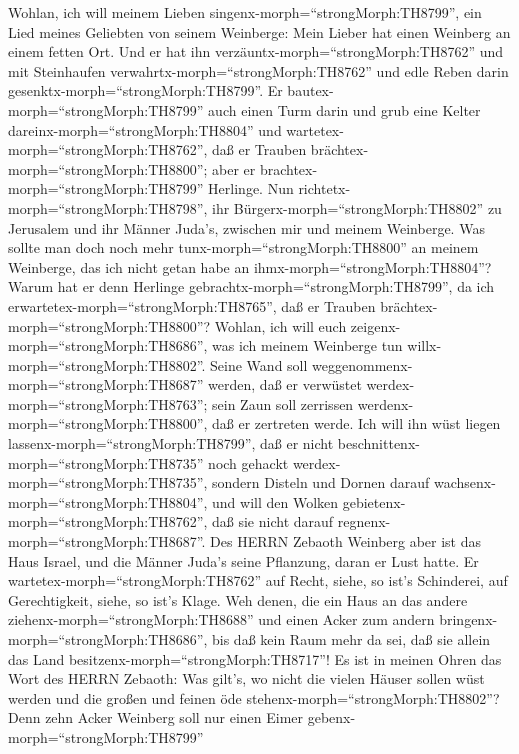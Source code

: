  Wohlan, ich will meinem Lieben
singenx-morph=``strongMorph:TH8799'', ein Lied meines Geliebten von
seinem Weinberge: Mein Lieber hat einen Weinberg an einem fetten Ort.
 Und er hat ihn verzäuntx-morph=``strongMorph:TH8762'' und
mit Steinhaufen verwahrtx-morph=``strongMorph:TH8762'' und edle Reben
darin gesenktx-morph=``strongMorph:TH8799''. Er
bautex-morph=``strongMorph:TH8799'' auch einen Turm darin und grub eine
Kelter dareinx-morph=``strongMorph:TH8804'' und
wartetex-morph=``strongMorph:TH8762'', daß er Trauben
brächtex-morph=``strongMorph:TH8800''; aber er
brachtex-morph=``strongMorph:TH8799'' Herlinge.  Nun
richtetx-morph=``strongMorph:TH8798'', ihr
Bürgerx-morph=``strongMorph:TH8802'' zu Jerusalem und ihr Männer Juda's,
zwischen mir und meinem Weinberge.  Was sollte man doch noch
mehr tunx-morph=``strongMorph:TH8800'' an meinem Weinberge, das ich
nicht getan habe an ihmx-morph=``strongMorph:TH8804''? Warum hat er denn
Herlinge gebrachtx-morph=``strongMorph:TH8799'', da ich
erwartetex-morph=``strongMorph:TH8765'', daß er Trauben
brächtex-morph=``strongMorph:TH8800''?  Wohlan, ich will
euch zeigenx-morph=``strongMorph:TH8686'', was ich meinem Weinberge tun
willx-morph=``strongMorph:TH8802''. Seine Wand soll
weggenommenx-morph=``strongMorph:TH8687'' werden, daß er verwüstet
werdex-morph=``strongMorph:TH8763''; sein Zaun soll zerrissen
werdenx-morph=``strongMorph:TH8800'', daß er zertreten werde.
 Ich will ihn wüst liegen
lassenx-morph=``strongMorph:TH8799'', daß er nicht
beschnittenx-morph=``strongMorph:TH8735'' noch gehackt
werdex-morph=``strongMorph:TH8735'', sondern Disteln und Dornen darauf
wachsenx-morph=``strongMorph:TH8804'', und will den Wolken
gebietenx-morph=``strongMorph:TH8762'', daß sie nicht darauf
regnenx-morph=``strongMorph:TH8687''.  Des HERRN Zebaoth
Weinberg aber ist das Haus Israel, und die Männer Juda's seine
Pflanzung, daran er Lust hatte. Er wartetex-morph=``strongMorph:TH8762''
auf Recht, siehe, so ist's Schinderei, auf Gerechtigkeit, siehe, so
ist's Klage.  Weh denen, die ein Haus an das andere
ziehenx-morph=``strongMorph:TH8688'' und einen Acker zum andern
bringenx-morph=``strongMorph:TH8686'', bis daß kein Raum mehr da sei,
daß sie allein das Land besitzenx-morph=``strongMorph:TH8717''!
 Es ist in meinen Ohren das Wort des HERRN Zebaoth: Was
gilt's, wo nicht die vielen Häuser sollen wüst werden und die großen und
feinen öde stehenx-morph=``strongMorph:TH8802''?  Denn zehn
Acker Weinberg soll nur einen Eimer gebenx-morph=``strongMorph:TH8799''
